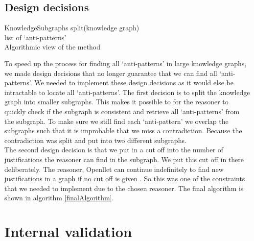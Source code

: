 \documentclass[11pt,letterpaper ,oneside ]{book}
\begin{document}
	\section{Design decisions}
	\begin{algorithm}
		KnowledgeSubgraphs split(knowledge graph)\\
		
		\Return list of `anti-patterns'\\
		\caption{Algorithmic view of the method}
		\label{finalAlgorithm}
	\end{algorithm}
	To speed up the process for finding all `anti-patterns' in large knowledge graphs, we made design decisions that no longer guarantee that we can find all `anti-patterns'. We needed to implement these design decisions as it would else be intractable to locate all `anti-patterns'. 
	The first decision is to split the knowledge graph into smaller subgraphs. This makes it possible to for the reasoner to quickly check if the subgraph is consistent and retrieve all `anti-patterns' from the subgraph. To make sure we still find each `anti-pattern' we overlap the subgraphs such that it is improbable that we miss a contradiction. Because the contradiction was split and put into two different subgraphs.\\
	The second design decision is that we put in a cut off into the number of justifications the reasoner can find in the subgraph. We put this cut off in there deliberately. The reasoner, Openllet can continue indefinitely to find new justifications in a graph if no cut off is given \cite{Openllet:2019}. So this was one of the constraints that we needed to implement due to the chosen reasoner. 
	The final algorithm is shown in algorithm \ref{finalAlgorithm}.\\
	
	
	
	\newpage
	
	\chapter{Internal validation}\label{internalvalidation}
	
\end{document}
